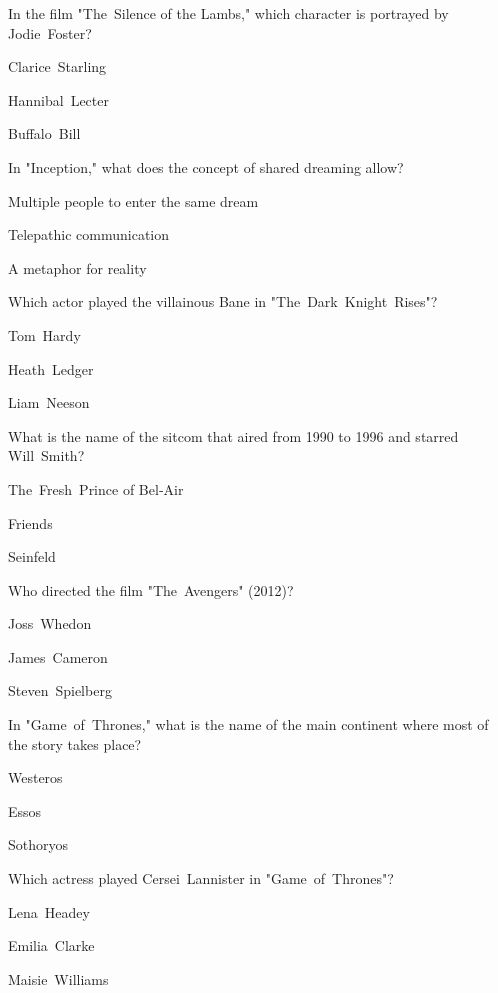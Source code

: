 \begin{enhancedmcq}{In the film "The Silence of the Lambs," which character is portrayed by Jodie Foster?}
\item Clarice Starling
\item Hannibal Lecter
\item Buffalo Bill

\end{enhancedmcq}
\begin{enhancedmcq}{In "Inception," what does the concept of shared dreaming allow?}
\item Multiple people to enter the same dream
\item Telepathic communication
\item A metaphor for reality

\end{enhancedmcq}
\begin{enhancedmcq}{Which actor played the villainous Bane in "The Dark Knight Rises"?}
\item Tom Hardy
\item Heath Ledger
\item Liam Neeson

\end{enhancedmcq}
\begin{enhancedmcq}{What is the name of the sitcom that aired from 1990 to 1996 and starred Will Smith?}
\item The Fresh Prince of Bel‑Air
\item Friends
\item Seinfeld

\end{enhancedmcq}
\begin{enhancedmcq}{Who directed the film "The Avengers" (2012)?}
\item Joss Whedon
\item James Cameron
\item Steven Spielberg

\end{enhancedmcq}
\begin{enhancedmcq}{In "Game of Thrones," what is the name of the main continent where most of the story takes place?}
\item Westeros
\item Essos
\item Sothoryos

\end{enhancedmcq}
\begin{enhancedmcq}{Which actress played Cersei Lannister in "Game of Thrones"?}
\item Lena Headey
\item Emilia Clarke
\item Maisie Williams

\end{enhancedmcq}
